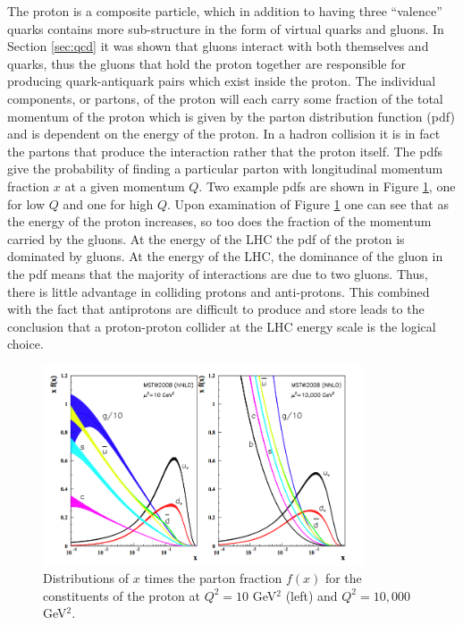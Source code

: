 The proton is a composite particle, which in addition to having three ``valence'' quarks contains more sub-structure in the form of virtual quarks and gluons. 
In Section \ref{sec:qcd} it was shown that gluons interact with both themselves and quarks, thus the gluons that hold the proton together are responsible for producing quark-antiquark pairs which exist inside the proton.
The individual components, or partons, of the proton will each carry some fraction of the total momentum of the proton which is given by the parton distribution function (pdf) and is dependent on the energy of the proton.
In a hadron collision it is in fact the partons that produce the interaction rather that the proton itself.
The pdfs give the probability of finding a particular parton with longitudinal momentum fraction $x$ at a given momentum $Q$. 
Two example pdfs are shown in Figure \ref{fig:pdf}, one for low $Q$ and one for high $Q$.
Upon examination of Figure \ref{fig:pdf} one can see that as the energy of the proton increases, so too does the fraction of the momentum carried by the gluons.
At the energy of the LHC the pdf of the proton is dominated by gluons. 
At the energy of the LHC, the dominance of the gluon in the pdf means that the majority of interactions are due to two gluons. 
Thus, there is little advantage in colliding protons and anti-protons.
This combined with the fact that antiprotons are difficult to produce and store leads to the conclusion that a proton-proton collider at the LHC energy scale is the logical choice.
\begin{figure}[htpb]
\begin{center}
\includegraphics[width=0.85\textwidth]{plots/pdf.png}
\caption{Distributions of $x$ times the parton fraction $f(x)$ for the constituents of the proton at $Q^{2} = 10$ GeV$^{2}$ (left) and $Q^{2} = 10,000$ GeV$^{2}$\cite{PDGREVIEW}.}
\label{fig:pdf}
\end{center}
\end{figure}


